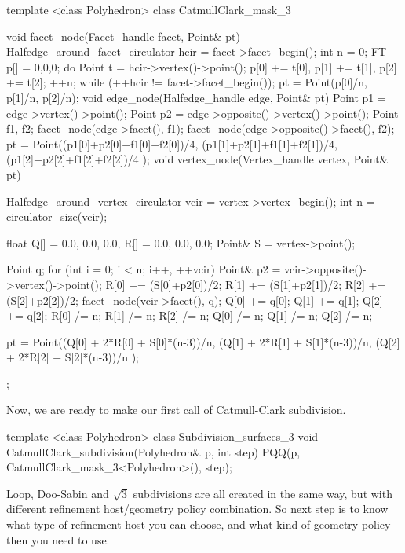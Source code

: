 \begin{ccExampleCode}
template <class Polyhedron>
class CatmullClark_mask_3 {
  void facet_node(Facet_handle facet, Point& pt) {
    Halfedge_around_facet_circulator hcir = facet->facet_begin();
    int n = 0;
    FT p[] = {0,0,0};
    do {
      Point t = hcir->vertex()->point();
      p[0] += t[0], p[1] += t[1], p[2] += t[2]; 
      ++n;
    } while (++hcir != facet->facet_begin());
    pt = Point(p[0]/n, p[1]/n, p[2]/n);
  }
  void edge_node(Halfedge_handle edge, Point& pt) {
    Point p1 = edge->vertex()->point();
    Point p2 = edge->opposite()->vertex()->point();
    Point f1, f2;
    facet_node(edge->facet(), f1);
    facet_node(edge->opposite()->facet(), f2);
    pt = Point((p1[0]+p2[0]+f1[0]+f2[0])/4,
               (p1[1]+p2[1]+f1[1]+f2[1])/4,
               (p1[2]+p2[2]+f1[2]+f2[2])/4 );
  }
  void vertex_node(Vertex_handle vertex, Point& pt) {
    Halfedge_around_vertex_circulator vcir = vertex->vertex_begin();
    int n = circulator_size(vcir);    

    float Q[] = {0.0, 0.0, 0.0}, R[] = {0.0, 0.0, 0.0};
    Point& S = vertex->point();
    
    Point q;
    for (int i = 0; i < n; i++, ++vcir) {
      Point& p2 = vcir->opposite()->vertex()->point();
      R[0] += (S[0]+p2[0])/2;
      R[1] += (S[1]+p2[1])/2;
      R[2] += (S[2]+p2[2])/2;
      facet_node(vcir->facet(), q);
      Q[0] += q[0];      
      Q[1] += q[1];      
      Q[2] += q[2];
    }
    R[0] /= n;    R[1] /= n;    R[2] /= n;
    Q[0] /= n;    Q[1] /= n;    Q[2] /= n;
      
    pt = Point((Q[0] + 2*R[0] + S[0]*(n-3))/n,
               (Q[1] + 2*R[1] + S[1]*(n-3))/n,
               (Q[2] + 2*R[2] + S[2]*(n-3))/n );
  }
};
\end{ccExampleCode}

Now, we are ready to make our first call of Catmull-Clark 
subdivision.

\begin{ccExampleCode}
template <class Polyhedron>
class Subdivision_surfaces_3 {
  void CatmullClark_subdivision(Polyhedron& p, int step) {
    PQQ(p, CatmullClark_mask_3<Polyhedron>(), step);
  }
}
\end{ccExampleCode}

Loop, Doo-Sabin and $\sqrt{3}$ subdivisions are all created in the
same way, but with different refinement host/geometry policy
combination. So next step is to know what type of refinement host
you can choose, and what kind of geometry policy then you need to use.

